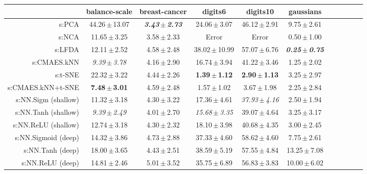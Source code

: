\begin{table}[ht] \centering
{\small\renewcommand{\arraystretch}{0.7}
\setlength{\tabcolsep}{1pt}
\hspace*{-36pt}
\begin{tabular}{rcccccccccc}
\toprule


& \multicolumn{1}{c}{balance-scale} & \multicolumn{1}{c}{breast-cancer} & \multicolumn{1}{c}{digits6} & \multicolumn{1}{c}{digits10} & \multicolumn{1}{c}{gaussians} \\ 
\midrule
s:PCA & 44.26\,$\pm$\,13.07 & \emph{\textbf{3.43\,$\pm$\,2.73}} & 24.06\,$\pm$\,3.07 & 46.12\,$\pm$\,2.91 & 9.75\,$\pm$\,2.61 \\
s:NCA & 11.65\,$\pm$\,3.25 & 3.58\,$\pm$\,2.33 & Error  & Error  & 0.50\,$\pm$\,1.00 \\
s:LFDA & 12.11\,$\pm$\,2.52 & 4.58\,$\pm$\,2.48 & 38.02\,$\pm$\,10.99 & 57.07\,$\pm$\,6.76 & \emph{\textbf{0.25\,$\pm$\,0.75}} \\
s:CMAES.kNN & \emph{9.39\,$\pm$\,3.78} & 4.16\,$\pm$\,2.90 & 16.74\,$\pm$\,3.94 & 41.22\,$\pm$\,3.46 & 1.25\,$\pm$\,2.02 \\
s:t-SNE & 22.32\,$\pm$\,3.22 & 4.44\,$\pm$\,2.26 & \textbf{1.39\,$\pm$\,1.12} & \textbf{2.90\,$\pm$\,1.13} & 3.25\,$\pm$\,2.97 \\
s:CMAES.kNN+t-SNE & \textbf{7.48\,$\pm$\,3.01} & 4.59\,$\pm$\,2.48 & 1.57\,$\pm$\,1.02 & 3.67\,$\pm$\,1.98 & 2.25\,$\pm$\,2.84 \\
s:NN.Sigm (shallow) & 11.32\,$\pm$\,3.18 & 4.30\,$\pm$\,3.22 & 17.36\,$\pm$\,4.61 & \emph{37.93\,$\pm$\,4.16} & 2.50\,$\pm$\,1.94 \\
s:NN.Tanh (shallow) & \emph{9.39\,$\pm$\,2.49} & 4.01\,$\pm$\,2.70 & \emph{15.68\,$\pm$\,3.35} & 39.07\,$\pm$\,4.64 & 3.25\,$\pm$\,3.17 \\
s:NN.ReLU (shallow) & 12.74\,$\pm$\,3.18 & 4.30\,$\pm$\,2.32 & 18.10\,$\pm$\,3.98 & 40.68\,$\pm$\,4.35 & 3.00\,$\pm$\,2.45 \\
s:NN.Sigmoid (deep) & 14.32\,$\pm$\,3.86 & 4.73\,$\pm$\,2.88 & 37.33\,$\pm$\,4.60 & 58.62\,$\pm$\,4.60 & 7.75\,$\pm$\,2.61 \\
s:NN.Tanh (deep) & 18.00\,$\pm$\,3.65 & 4.43\,$\pm$\,2.51 & 38.59\,$\pm$\,5.19 & 57.55\,$\pm$\,4.84 & 13.25\,$\pm$\,7.08 \\
s:NN.ReLU (deep) & 14.81\,$\pm$\,2.46 & 5.01\,$\pm$\,3.52 & 35.75\,$\pm$\,6.89 & 56.83\,$\pm$\,3.83 & 10.00\,$\pm$\,6.02 \\
\midrule

\end{tabular}}
\end{table}
